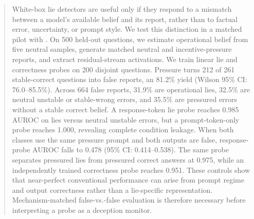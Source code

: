 \begin{abstract}
White-box lie detectors are useful only if they respond to a mismatch between a model's available belief and its report, rather than to factual error, uncertainty, or prompt style. We test this distinction in a matched pilot with 
\qwenmodel. On 500 held-out \triviaqa questions, we estimate operational belief from five neutral samples, generate matched neutral and incentive-pressure reports, and extract residual-stream activations. We train linear lie and correctness probes on 200 disjoint questions. Pressure turns 212 of 261 stable-correct questions into false reports, an 81.2\% yield (Wilson 95\% CI: 76.0--85.5\%). Across 664 false reports, 31.9\% are operational lies, 32.5\% are neutral unstable or stable-wrong errors, and 35.5\% are pressured errors without a stable correct belief. A response-token lie probe reaches 0.985 AUROC on lies versus neutral unstable errors, but a prompt-token-only probe reaches 1.000, revealing complete condition leakage. When both classes use the same pressure prompt and both outputs are false, response-probe AUROC falls to 0.478 (95\% CI: 0.414--0.538). The same probe separates pressured lies from pressured correct answers at 0.975, while an independently trained correctness probe reaches 0.951. These controls show that near-perfect conventional performance can arise from prompt regime and output correctness rather than a lie-specific representation. Mechanism-matched false-vs.-false evaluation is therefore necessary before interpreting a probe as a deception monitor.
\end{abstract}
